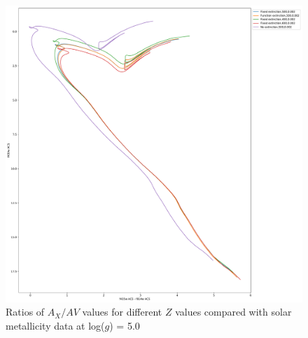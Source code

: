 \documentclass[12pt, a4paper]{report}
\begin{document}
\begin{figure}[h]
\begin{center}
\includegraphics[scale=0.3]{../basti_isochrones_10_13Gyr/Extinction_T5k_FeH0fix_func_f435wACS_f435wACSmf814wACS_500_400_600_Myr_FeH_0p002_ref_noext_Av_1p0.pdf}
\caption{Ratios of $A_{X}/A{V}$ values for different $Z$ values compared with solar metallicity data at log($g$) = 5.0}
\label{acs_isoc_T5k}
\end{center}
\end{figure}
\end{document}
